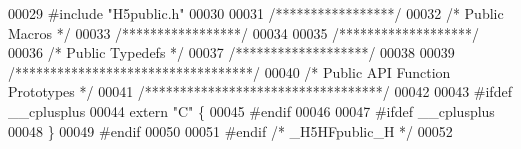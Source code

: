 \begin{DoxyCode}
00029 \textcolor{preprocessor}{#include "H5public.h"}
00030 
00031 \textcolor{comment}{/*****************/}
00032 \textcolor{comment}{/* Public Macros */}
00033 \textcolor{comment}{/*****************/}
00034 
00035 \textcolor{comment}{/*******************/}
00036 \textcolor{comment}{/* Public Typedefs */}
00037 \textcolor{comment}{/*******************/}
00038 
00039 \textcolor{comment}{/**********************************/}
00040 \textcolor{comment}{/* Public API Function Prototypes */}
00041 \textcolor{comment}{/**********************************/}
00042 
00043 \textcolor{preprocessor}{#ifdef \_\_cplusplus}
00044 \textcolor{keyword}{extern} \textcolor{stringliteral}{"C"} \{
00045 \textcolor{preprocessor}{#endif}
00046 
00047 \textcolor{preprocessor}{#ifdef \_\_cplusplus}
00048 \}
00049 \textcolor{preprocessor}{#endif}
00050 
00051 \textcolor{preprocessor}{#endif }\textcolor{comment}{/* \_H5HFpublic\_H */}\textcolor{preprocessor}{}
00052 
\end{DoxyCode}

